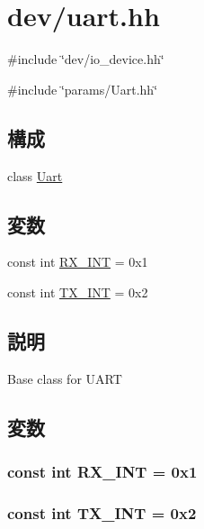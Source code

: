 \hypertarget{uart_8hh}{
\section{dev/uart.hh}
\label{uart_8hh}
}
{\ttfamily \#include \char`\"{}dev/io\_\-device.hh\char`\"{}}\par
{\ttfamily \#include \char`\"{}params/Uart.hh\char`\"{}}\par
\subsection*{構成}
\begin{DoxyCompactItemize}
\item 
class \hyperlink{classUart}{Uart}
\end{DoxyCompactItemize}
\subsection*{変数}
\begin{DoxyCompactItemize}
\item 
const int \hyperlink{uart_8hh_a28b4277b8172dbd02cdae652eb2876ce}{RX\_\-INT} = 0x1
\item 
const int \hyperlink{uart_8hh_a38c4519ecde42c7c14ff4c1a17b52f2c}{TX\_\-INT} = 0x2
\end{DoxyCompactItemize}


\subsection{説明}
Base class for UART 

\subsection{変数}
\hypertarget{uart_8hh_a28b4277b8172dbd02cdae652eb2876ce}{
\subsubsection[{RX\_\-INT}]{\setlength{\rightskip}{0pt plus 5cm}const int {\bf RX\_\-INT} = 0x1}}
\label{uart_8hh_a28b4277b8172dbd02cdae652eb2876ce}
\hypertarget{uart_8hh_a38c4519ecde42c7c14ff4c1a17b52f2c}{
\subsubsection[{TX\_\-INT}]{\setlength{\rightskip}{0pt plus 5cm}const int {\bf TX\_\-INT} = 0x2}}
\label{uart_8hh_a38c4519ecde42c7c14ff4c1a17b52f2c}
